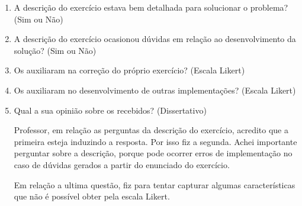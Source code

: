 \begin{enumerate}
	\item A descrição do exercício estava bem detalhada para solucionar o problema? (Sim ou Não)
	\item A descrição do exercício ocasionou dúvidas em relação ao desenvolvimento da solução? (Sim ou Não)
	
	\item Os  auxiliaram na correção do próprio exercício? (Escala Likert)
	
	\item Os  auxiliaram no desenvolvimento de outras implementações? (Escala Likert)
	
	\item Qual a sua opinião sobre os  recebidos? (Dissertativo)
	
	Professor, em relação as perguntas da descrição do exercício, acredito que a primeira esteja induzindo a resposta. Por isso fiz a segunda. Achei importante perguntar sobre a descrição, porque pode ocorrer erros de implementação no caso de dúvidas gerados a partir do enunciado do exercício.
	
	Em relação a ultima questão, fiz para tentar capturar algumas características que não é possível obter pela escala Likert.
\end{enumerate}